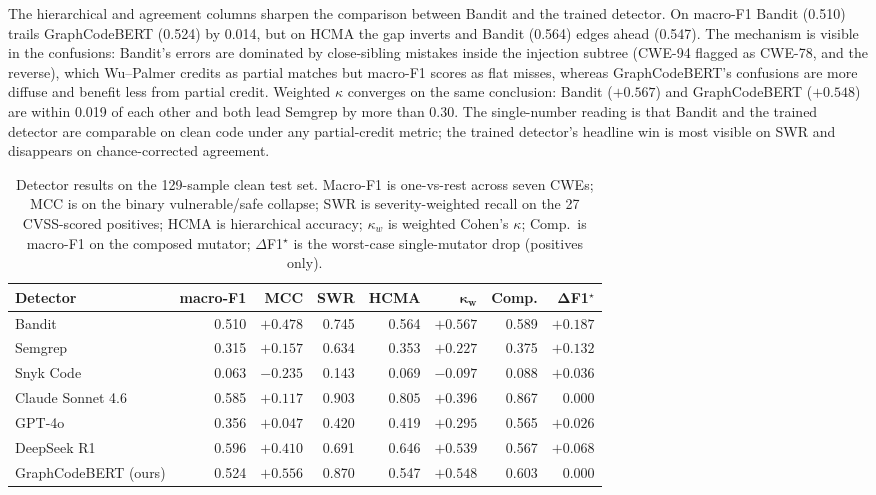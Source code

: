 \documentclass[conference]{IEEEtran}
\begin{document}
The hierarchical and agreement columns sharpen the comparison between
Bandit and the trained detector. On macro-F1 Bandit (0.510) trails
GraphCodeBERT (0.524) by 0.014, but on HCMA the gap inverts and Bandit
(0.564) edges ahead (0.547). The mechanism is visible in the confusions:
Bandit's errors are dominated by close-sibling mistakes inside the
injection subtree (CWE-94 flagged as CWE-78, and the reverse), which
Wu--Palmer credits as partial matches but macro-F1 scores as flat misses,
whereas GraphCodeBERT's confusions are more diffuse and benefit less from
partial credit. Weighted $\kappa$ converges on the same conclusion:
Bandit ($+0.567$) and GraphCodeBERT ($+0.548$) are within 0.019 of each
other and both lead Semgrep by more than 0.30. The single-number reading
is that Bandit and the trained detector are comparable on clean code
under any partial-credit metric; the trained detector's headline win is
most visible on SWR and disappears on chance-corrected agreement.

\begin{table}[t]
\caption{Detector results on the 129-sample clean test set. Macro-F1 is
one-vs-rest across seven CWEs; MCC is on the binary vulnerable/safe
collapse; SWR is severity-weighted recall on the 27 CVSS-scored
positives; HCMA is hierarchical accuracy; $\kappa_w$ is weighted Cohen's
$\kappa$; Comp.\ is macro-F1 on the composed mutator; $\Delta$F1$^\star$
is the worst-case single-mutator drop (positives only).}
\label{tab:headline}
\centering
\begin{tabular}{lrrrrrrr}
\toprule
\textbf{Detector} & \textbf{macro-F1} & \textbf{MCC} & \textbf{SWR} & \textbf{HCMA} & $\boldsymbol{\kappa_w}$ & \textbf{Comp.} & $\boldsymbol{\Delta}$\textbf{F1}$^{\star}$ \\
\midrule
Bandit               & 0.510 & $+0.478$ & 0.745 & 0.564 & $\mathbf{+0.567}$ & 0.589 & $+0.187$ \\
Semgrep              & 0.315 & $+0.157$ & 0.634 & 0.353 & $+0.227$ & 0.375 & $+0.132$ \\
Snyk Code            & 0.063 & $-0.235$ & 0.143 & 0.069 & $-0.097$ & 0.088 & $+0.036$ \\
Claude Sonnet 4.6    & 0.585 & $+0.117$ & $\mathbf{0.903}$ & $\mathbf{0.805}$ & $+0.396$ & 0.867 & $0.000$ \\
GPT-4o               & 0.356 & $+0.047$ & 0.420 & 0.419 & $+0.295$ & 0.565 & $+0.026$ \\
DeepSeek R1          & $\mathbf{0.596}$ & $+0.410$ & 0.691 & 0.646 & $+0.539$ & 0.567 & $+0.068$ \\
GraphCodeBERT (ours) & 0.524 & $\mathbf{+0.556}$ & 0.870 & 0.547 & $+0.548$ & 0.603 & $0.000$ \\
\bottomrule
\end{tabular}
\end{table}
\end{document}
